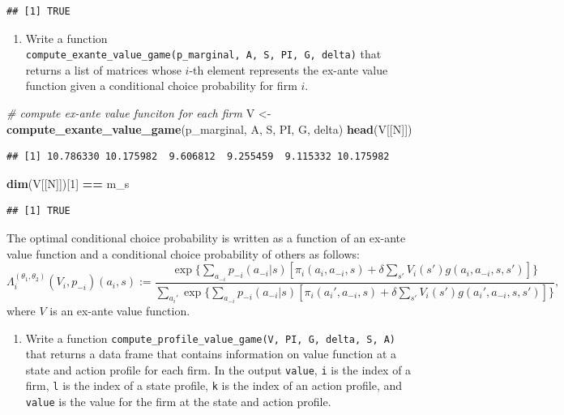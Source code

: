\documentclass[]{book}
\newenvironment{Shaded}{\begin{snugshade}}{\end{snugshade}}
\newcommand{\KeywordTok}[1]{\textcolor[rgb]{0.13,0.29,0.53}{\textbf{#1}}}
\newcommand{\DecValTok}[1]{\textcolor[rgb]{0.00,0.00,0.81}{#1}}
\newcommand{\StringTok}[1]{\textcolor[rgb]{0.31,0.60,0.02}{#1}}
\newcommand{\CommentTok}[1]{\textcolor[rgb]{0.56,0.35,0.01}{\textit{#1}}}
\newcommand{\OperatorTok}[1]{\textcolor[rgb]{0.81,0.36,0.00}{\textbf{#1}}}
\newcommand{\NormalTok}[1]{#1}
\providecommand{\tightlist}{%
  \setlength{\itemsep}{0pt}\setlength{\parskip}{0pt}}
\begin{document}
\begin{verbatim}
## [1] TRUE
\end{verbatim}

\begin{enumerate}
\def\labelenumi{\arabic{enumi}.}
\setcounter{enumi}{6}
\tightlist
\item
  Write a function
  \texttt{compute\_exante\_value\_game(p\_marginal,\ A,\ S,\ PI,\ G,\ delta)}
  that returns a list of matrices whose \(i\)-th element represents the
  ex-ante value function given a conditional choice probability for firm
  \(i\).
\end{enumerate}

\begin{Shaded}
\begin{Highlighting}[]
\CommentTok{# compute ex-ante value funciton for each firm}
\NormalTok{V <-}\StringTok{ }\KeywordTok{compute_exante_value_game}\NormalTok{(p_marginal, A, S, PI, G, delta)}
\KeywordTok{head}\NormalTok{(V[[N]])}
\end{Highlighting}
\end{Shaded}

\begin{verbatim}
## [1] 10.786330 10.175982  9.606812  9.255459  9.115332 10.175982
\end{verbatim}

\begin{Shaded}
\begin{Highlighting}[]
\KeywordTok{dim}\NormalTok{(V[[N]])[}\DecValTok{1}\NormalTok{] }\OperatorTok{==}\StringTok{ }\NormalTok{m_s}
\end{Highlighting}
\end{Shaded}

\begin{verbatim}
## [1] TRUE
\end{verbatim}

The optimal conditional choice probability is written as a function of
an ex-ante value function and a conditional choice probability of others
as follows: \[
\Lambda_i^{(\theta_1, \theta_2)}(V_i, p_{-i})(a_i, s) := \frac{\exp\{\sum_{a_{-i}}p_{-i}(a_{-i}|s)[\pi_i(a_i, a_{-i}, s) + \delta \sum_{s'}V_i(s')g(a_i, a_{-i}, s, s')]\}}{\sum_{a_i'}\exp\{\sum_{a_{-i}}p_{-i}(a_{-i}|s)[\pi_i(a_i', a_{-i}, s) + \delta \sum_{s'}V_i(s')g(a_i', a_{-i}, s, s')]\}},
\] where \(V\) is an ex-ante value function.

\begin{enumerate}
\def\labelenumi{\arabic{enumi}.}
\setcounter{enumi}{7}
\tightlist
\item
  Write a function
  \texttt{compute\_profile\_value\_game(V,\ PI,\ G,\ delta,\ S,\ A)}
  that returns a data frame that contains information on value function
  at a state and action profile for each firm. In the output
  \texttt{value}, \texttt{i} is the index of a firm, \texttt{l} is the
  index of a state profile, \texttt{k} is the index of an action
  profile, and \texttt{value} is the value for the firm at the state and
  action profile.
\end{enumerate}
\end{document}
